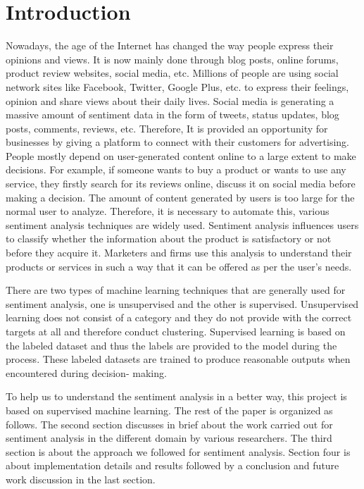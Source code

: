 \section{Introduction}
\label{sec:intro}

Nowadays, the age of the Internet has changed the way people express their opinions and views.  It is now mainly done through blog posts, online forums, product review websites, social media, etc. Millions of people are using social network sites like Facebook, Twitter, Google Plus, etc. to express their feelings, opinion and share views about their daily lives. Social media is generating a massive amount of sentiment data in the form of tweets, status updates, blog posts, comments, reviews, etc.  Therefore, It is provided an opportunity for businesses by giving a platform to connect with their customers for advertising. People mostly depend on user-generated content online to a large extent to make decisions. For example, if someone wants to buy a product or wants to use any service, they firstly search for its reviews online, discuss it on social media before making a decision. The amount of content generated by users is too large for the normal user to analyze. Therefore, it is necessary to automate this, various sentiment analysis techniques are widely used. Sentiment analysis influences users to classify whether the information about the product is satisfactory or not before they acquire it. Marketers and firms use this analysis to understand their products or services in such a way that it can be offered as per the user’s needs.

There are two types of machine learning techniques that are generally used for sentiment analysis, one is unsupervised and the other is supervised. Unsupervised learning does not consist of a category and they do not provide with the correct targets at all and therefore conduct clustering. Supervised learning is based on the labeled dataset and thus the labels are provided to the model during the process. These labeled datasets are trained to produce reasonable outputs when encountered during decision- making. 

To help us to understand the sentiment analysis in a better way, this project is based on supervised machine learning. The rest of the paper is organized as follows. The second section discusses in brief about the work carried out for sentiment analysis in the different domain by various researchers. The third section is about the approach we followed for sentiment analysis. Section four is about implementation details and results followed by a conclusion and future work discussion in the last section. 
